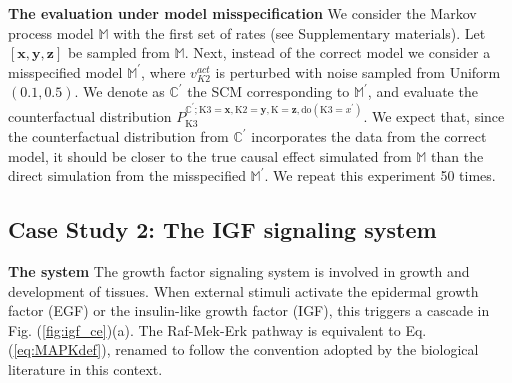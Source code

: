 \documentclass{article}
\def\eqref#1{Eq. (\ref{#1})}
\def\figref#1{Fig. (\ref{#1})}
\begin{document}
{\bf The evaluation under model misspecification} We consider the Markov process model $\mathbb{M}$ with the first set of rates (see Supplementary materials). Let $[\mathbf{x},\mathbf{y},\mathbf{z}]$ be sampled from $\mathbb{M}$.
Next, instead of the correct model we consider a misspecified model $\mathbb{M}^{\prime}$, where $v^{act}_{K2}$ is perturbed with noise sampled from Uniform$(0.1, 0.5)$.
We denote as $\mathbb{C}^{\prime}$  the SCM corresponding to $\mathbb{M}^{\prime}$, and evaluate the counterfactual distribution $P_{\text{K3}}^{\mathbb{C}^{\prime}; \text{K3}=\mathbf{x}, \text{K2}=\mathbf{y}, \text{K}=\mathbf{z}, \text{do}(\text{K3} = x^{\prime})}$. We expect that, since the counterfactual distribution from $\mathbb{C}^{\prime}$ incorporates the data from the correct model, it should be closer to the true causal effect simulated from $\mathbb{M}$ than the direct simulation from the misspecified $\mathbb{M}^{\prime}$. We repeat this experiment 50 times.
\begin{table}[]
\addtolength{\parskip}{-3mm}
\centering
{}
\caption{\small The hazard functions in Case study 1 (MAPK), specified according to mass action enzyme kinetics. \label{dyn_model}}

\vspace{-5mm}
\end{table}

\subsection{Case Study 2: The IGF signaling system}

{\bf The system} The growth factor signaling system is involved in growth and development of tissues. When external stimuli activate the epidermal growth factor (EGF) or the insulin-like growth factor (IGF), this triggers a cascade \cite{BIANCONI2012142} in \figref{fig:igf_ce}(a). The Raf-Mek-Erk pathway is equivalent to \eqref{eq:MAPKdef},  renamed to follow the convention adopted by the biological literature in this context.
\end{document}
